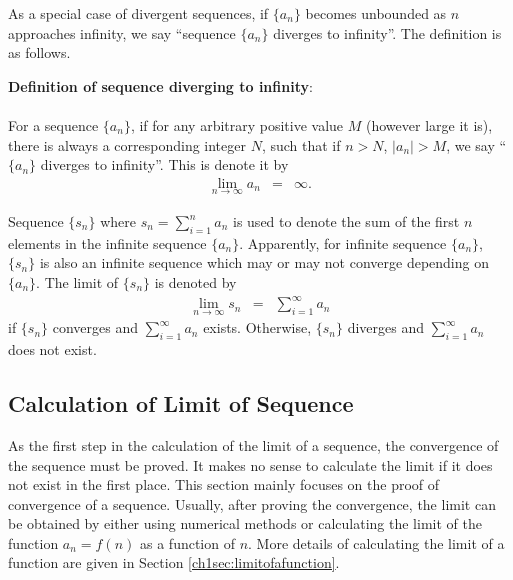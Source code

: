 As a special case of divergent sequences, if $\{a_n\}$ becomes unbounded as $n$ approaches infinity, we say ``sequence $\{a_n\}$ diverges to infinity''. The definition is as follows.
\begin{mdframed}

\textbf{Definition of sequence diverging to infinity}:
\\
\\
\noindent For a sequence $\{a_n\}$, if for any arbitrary positive value $M$ (however large it is), there is always a corresponding integer $N$, such that if $n>N$, $|a_n|>M$, we say ``$\{a_n\}$ diverges to infinity''. This is denote it by
\begin{eqnarray}
  \lim_{n\rightarrow \infty}a_n &=& \infty. \nonumber
\end{eqnarray}
\end{mdframed}

Sequence $\{s_n\}$ where $s_n=\sum_{i=1}^{n}a_n$ is used to denote the sum of the first $n$ elements in the infinite sequence $\{a_n\}$. Apparently, for infinite sequence $\{a_n\}$, $\{s_n\}$ is also an infinite sequence which may or may not converge depending on $\{a_n\}$. The limit of $\{s_n\}$ is denoted by
\begin{eqnarray}
  \lim_{n\rightarrow\infty}s_n &=& \sum_{i=1}^{\infty} a_n \nonumber
\end{eqnarray}
if $\{s_n\}$ converges and $\sum_{i=1}^{\infty} a_n$ exists. Otherwise, $\{s_n\}$ diverges and $\sum_{i=1}^{\infty} a_n$ does not exist.

\subsection{Calculation of Limit of Sequence} \label{chisubsec:proofofsequenceconvergence}

As the first step in the calculation of the limit of a sequence, the convergence of the sequence must be proved. It makes no sense to calculate the limit if it does not exist in the first place. This section mainly focuses on the proof of convergence of a sequence. Usually, after proving the convergence, the limit can be obtained by either using numerical methods or calculating the limit of the function $a_n=f(n)$ as a function of $n$. More details of calculating the limit of a function are given in Section \ref{ch1sec:limitofafunction}.

